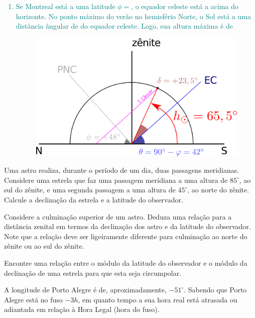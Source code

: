 \begin{sol}
	\textcolor{teal} {
		\begin{enumerate}[label=\alph *)]
			\item Se Montreal está a uma latitude $\phi=$, o equador celeste está a  acima do horizonte. No ponto máximo do verão no hemisfério Norte, o Sol está a uma distância ângular de  do equador celeste. Logo, sua altura máxima é de 
			\begin{figure}[!h]
				\begin{center}
					\includegraphics[width=0.5\linewidth]{fig/fig-ex12a.png}
				\end{center}
			\end{figure}
		\end{enumerate}
	}
\end{sol}
\begin{prob}
	Uma astro realiza, durante o período de um dia, duas passagens meridianas. Considere uma
	estrela que faz uma passagem meridiana a uma altura de $85^{\circ}$, ao sul do zênite, e uma segunda
	passagem a uma altura de $45^{\circ}$, ao norte do zênite. Calcule a declinação da estrela e a latitude do
	observador.
\end{prob}
\begin{prob}
	Considere a culminação superior de um astro. Deduza uma relação para a distância zenital em
	termos da declinação dos astro e da latitude do observador. Note que a relação deve ser ligeiramente
	diferente para culminação ao norte do zênite ou ao sul do zênite.
\end{prob}
\begin{prob}
	Encontre uma relação entre o módulo da latitude do observador e o módulo da declinação de
	uma estrela para que esta seja circumpolar.
\end{prob}
\begin{prob}
	A longitude de Porto Alegre é de, aproximadamente, $-51^{\circ}$. Sabendo que Porto Alegre está no
	fuso $-3h$, em quanto tempo a sua hora real está atrasada ou adiantada em relação à Hora Legal (hora
	do fuso).
\end{prob}